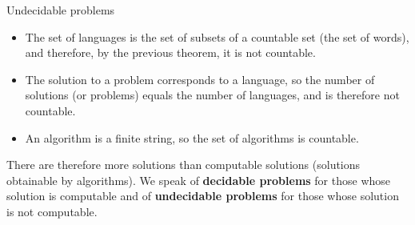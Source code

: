 \documentclass[compress,dvips,xcolor={dvipsnames},t]{beamer}
\begin{document}
%
\begin{frame}{Undecidable problems}

\begin{itemize}

  \item The set of languages is the set of subsets of a countable
  set (the set of words), and therefore, by the previous theorem, it
  is not countable.

  \item The solution to a problem corresponds to a language, so the
  number of solutions (or problems) equals the number of languages,
  and is therefore not countable.

  \item An algorithm is a finite string, so the set of algorithms is
  countable.

\end{itemize}

There are therefore more solutions than computable solutions
(solutions obtainable by algorithms). We speak of \textbf{decidable
  problems} for those whose solution is computable and of
\textbf{undecidable problems} for those whose solution is not
computable.

\end{frame}
\end{document}
